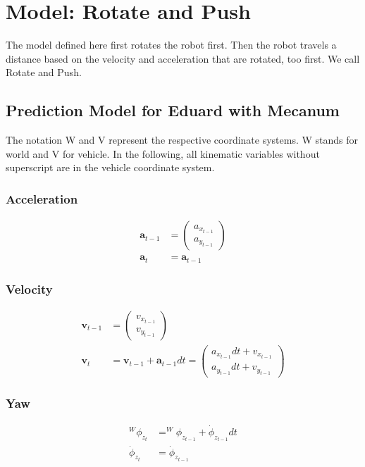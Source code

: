 \documentclass{article}
\newcommand{\Yaw}[1]{^W\phi_{z_{#1}}}
\begin{document}
\section{Model: Rotate and Push}



The model defined here first rotates the robot first. Then the robot travels a distance based on the velocity and acceleration  that are rotated, too first. We call Rotate and Push.

\subsection{Prediction Model for Eduard with Mecanum}

The notation W and V represent the respective coordinate systems. W stands for world and V for vehicle. In the following, all kinematic variables without superscript are in the vehicle coordinate system.

\subsubsection{Acceleration}
\begin{align}
  \textbf{a}_{t-1} &= \left(\begin{matrix}a_{x_{t-1}}\\a_{y_{t-1}}\end{matrix}\right) \\
  \textbf{a}_t &= \textbf{a}_{t-1}
\end{align}

\subsubsection{Velocity}
\begin{align}
  \textbf{v}_{t-1} &= \left(\begin{matrix}v_{x_{t-1}}\\v_{y_{t-1}}\end{matrix}\right) \\
  \textbf{v}_t &= \textbf{v}_{t-1} + \textbf{a}_{t-1} dt = 
  \left(\begin{matrix}a_{x_{t-1}} dt + v_{x_{t-1}}\\a_{y_{t-1}} dt + v_{y_{t-1}}\end{matrix}\right)
\end{align}

\subsubsection{Yaw}
\begin{align}
  \Yaw{t} &= \Yaw{t-1} + \dot{\phi}_{z_{t-1}} dt \\
  \dot{\phi}_{z_t} &= \dot{\phi}_{z_{t-1}}
\end{align}
\end{document}
